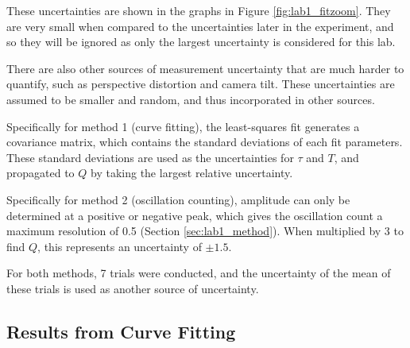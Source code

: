 \documentclass[aps,twocolumn,secnumarabic,nobalancelastpage,amsmath,amssymb,nofootinbib,floatfix,letterpaper]{revtex4}
\begin{document}
These uncertainties are shown in the graphs in Figure \ref{fig:lab1_fitzoom}. They are very small when
compared to the uncertainties later in the experiment, and so they will be ignored as only the largest uncertainty is
considered for this lab.

There are also other sources of measurement uncertainty that are much harder to quantify, such as perspective
distortion and camera tilt. These uncertainties are assumed to be smaller and random, and thus incorporated in other
sources.

Specifically for method 1 (curve fitting), the least-squares fit generates a covariance matrix, which contains the
standard deviations of each fit parameters. These standard deviations are used as the uncertainties for \(\tau\) and
\(T\), and propagated to \(Q\) by taking the largest relative uncertainty.

Specifically for method 2 (oscillation counting), amplitude can only be determined at a positive or negative peak, which
gives the oscillation count a maximum resolution of 0.5 (Section \ref{sec:lab1_method}). When multiplied by 3 to find
\(Q\), this represents an uncertainty of \(\pm 1.5\).

For both methods, 7 trials were conducted, and the uncertainty of the mean of these trials is used as another source of
uncertainty.

\subsection{Results from Curve Fitting}
\end{document}
